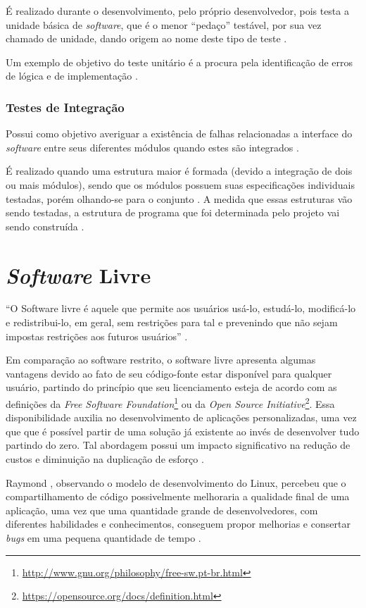         É realizado durante o desenvolvimento, pelo próprio desenvolvedor, pois testa a unidade básica de \textit{software}, que é o menor ``pedaço''  testável, por sua vez chamado de unidade, dando origem ao nome deste tipo de teste \cite{sw_test_tech}.

        Um exemplo de objetivo do teste unitário é a procura pela identificação de erros de lógica e de implementação \cite{maldonado}.

        \subsubsection{Testes de Integração}
        Possui como objetivo averiguar a existência de falhas relacionadas a interface do \textit{software} entre seus diferentes módulos quando estes são integrados \cite{artigo_intro_teste}.

        É realizado quando uma estrutura maior é formada (devido a integração de dois ou mais módulos), sendo que os módulos possuem suas especificações individuais testadas, porém olhando-se para o conjunto \cite{sw_test_tech}. A medida que essas estruturas vão sendo testadas, a estrutura de programa que foi determinada pelo projeto vai sendo construída \cite{maldonado}.

\section{\textit{Software} Livre}
``O Software livre é aquele que permite aos usuários usá-lo, estudá-lo, modificá-lo e redistribui-lo, em geral, sem restrições para tal e prevenindo que não sejam impostas restrições aos futuros usuários'' \cite{meirelles2013}.

Em comparação ao software restrito, o software livre apresenta algumas vantagens devido ao fato de seu código-fonte estar disponível para qualquer usuário, partindo do princípio que seu licenciamento esteja de acordo com as definições da \textit{Free Software Foundation}\footnote{\url{http://www.gnu.org/philosophy/free-sw.pt-br.html}} ou da \textit{Open Source Initiative}\footnote{\url{https://opensource.org/docs/definition.html}}. Essa disponibilidade auxilia no desenvolvimento de aplicações personalizadas, uma vez que que é possível partir de uma solução já existente ao invés de desenvolver tudo partindo do zero. Tal abordagem possui um impacto significativo na redução de custos e diminuição na duplicação de esforço \cite{meirelles2013}.

Raymond \cite{raymond1999}, observando o modelo de desenvolvimento do Linux, percebeu que o compartilhamento de código possivelmente melhoraria a qualidade final de uma aplicação, uma vez que uma quantidade grande de desenvolvedores, com diferentes habilidades e conhecimentos, conseguem propor melhorias e consertar \textit{bugs} em uma pequena quantidade de tempo \cite{meirelles2013}.

